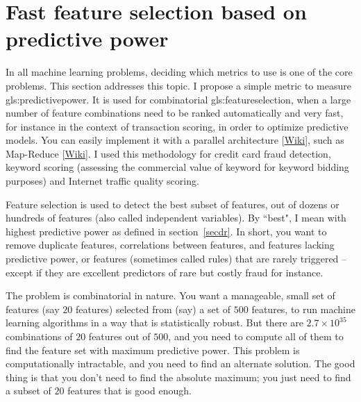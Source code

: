 \documentclass[oneside,10pt]{book}
\begin{document}

\section{Fast feature selection based on predictive power}

In all machine learning problems, deciding which metrics to use is one of the core problems. This section addresses this topic. I propose a simple metric to measure \gls{gls:predictivepower}. It is used for combinatorial \gls{gls:featureselection}, when a large number of feature combinations need to be ranked automatically and very fast, for instance in the context of transaction scoring, in order to optimize predictive models. You can easily implement it with
 a \textcolor{index}{parallel architecture} [\href{https://en.wikipedia.org/wiki/Parallel_computing}{Wiki}], such as \textcolor{index}{Map-Reduce} [\href{https://en.wikipedia.org/wiki/MapReduce}{Wiki}]. I used this methodology for credit card fraud detection, keyword scoring (assessing the commercial value of keyword for keyword bidding purposes) and Internet traffic quality scoring.

Feature selection is used to detect the best subset of features, out of dozens or hundreds of features (also called independent variables). By ``best", I mean with highest predictive power as defined in section~\ref{secdr}. In short, you want to remove duplicate features, correlations between features, and features lacking predictive power, or features (sometimes called rules) that are rarely triggered -- except if they are excellent predictors of rare but costly fraud for instance.

The problem is combinatorial in nature. You want a manageable, small set of features (say $20$ features) selected from (say) a set of $500$ features, to run machine learning algorithms  in a way that is statistically robust. But there are $2.7 \times 10^{35}$ combinations of $20$ features out of $500$, and you need to compute all of them to find the feature set with maximum predictive power. This problem is computationally intractable, and you need to find an alternate solution. The good thing is that you don’t need to find the absolute maximum; you just need to find a subset of $20$ features that is good enough.
\end{document}
